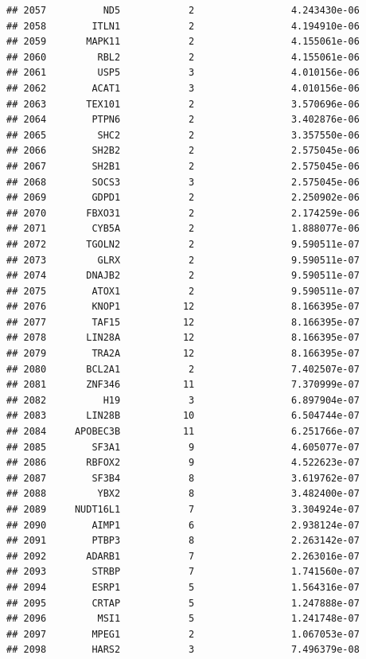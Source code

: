 \documentclass[
]{article}
\begin{document}
\begin{verbatim}
## 2057          ND5            2                 4.243430e-06
## 2058        ITLN1            2                 4.194910e-06
## 2059       MAPK11            2                 4.155061e-06
## 2060         RBL2            2                 4.155061e-06
## 2061         USP5            3                 4.010156e-06
## 2062        ACAT1            3                 4.010156e-06
## 2063       TEX101            2                 3.570696e-06
## 2064        PTPN6            2                 3.402876e-06
## 2065         SHC2            2                 3.357550e-06
## 2066        SH2B2            2                 2.575045e-06
## 2067        SH2B1            2                 2.575045e-06
## 2068        SOCS3            3                 2.575045e-06
## 2069        GDPD1            2                 2.250902e-06
## 2070       FBXO31            2                 2.174259e-06
## 2071        CYB5A            2                 1.888077e-06
## 2072       TGOLN2            2                 9.590511e-07
## 2073         GLRX            2                 9.590511e-07
## 2074       DNAJB2            2                 9.590511e-07
## 2075        ATOX1            2                 9.590511e-07
## 2076        KNOP1           12                 8.166395e-07
## 2077        TAF15           12                 8.166395e-07
## 2078       LIN28A           12                 8.166395e-07
## 2079        TRA2A           12                 8.166395e-07
## 2080       BCL2A1            2                 7.402507e-07
## 2081       ZNF346           11                 7.370999e-07
## 2082          H19            3                 6.897904e-07
## 2083       LIN28B           10                 6.504744e-07
## 2084     APOBEC3B           11                 6.251766e-07
## 2085        SF3A1            9                 4.605077e-07
## 2086       RBFOX2            9                 4.522623e-07
## 2087        SF3B4            8                 3.619762e-07
## 2088         YBX2            8                 3.482400e-07
## 2089     NUDT16L1            7                 3.304924e-07
## 2090        AIMP1            6                 2.938124e-07
## 2091        PTBP3            8                 2.263142e-07
## 2092       ADARB1            7                 2.263016e-07
## 2093        STRBP            7                 1.741560e-07
## 2094        ESRP1            5                 1.564316e-07
## 2095        CRTAP            5                 1.247888e-07
## 2096         MSI1            5                 1.241748e-07
## 2097        MPEG1            2                 1.067053e-07
## 2098        HARS2            3                 7.496379e-08

\end{verbatim}
\end{document}

